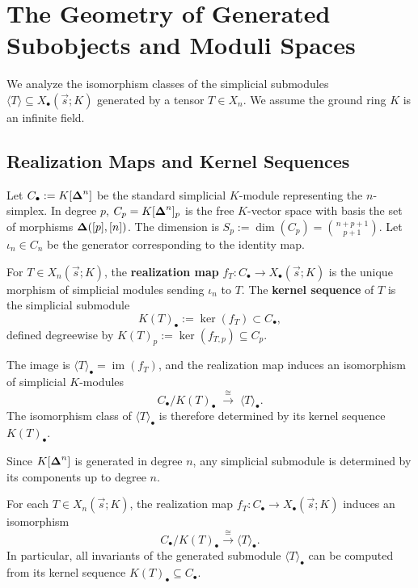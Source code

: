 \section{The Geometry of Generated Subobjects and Moduli Spaces}
\label{sec:generated}

We analyze the isomorphism classes of the simplicial submodules
$\langle T \rangle \subseteq X_\bullet(\vec s; K)$ generated by a tensor
$T\in X_n$. We assume the ground ring $K$ is an infinite field.


\subsection{Realization Maps and Kernel Sequences}

Let $C_\bullet := K[\boldsymbol{\Delta}^n]$ be the standard simplicial $K$-module representing the
$n$-simplex. In degree $p$, $C_p = K[\boldsymbol{\Delta}^n]_p$ is the free $K$-vector space
with basis the set of morphisms $\boldsymbol{\Delta}([p],[n])$. The dimension is
$S_p := \dim(C_p) = \binom{n+p+1}{p+1}$. Let
$\iota_n \in C_n$ be the generator corresponding to the identity map.

\begin{definition}
For $T\in X_n(\vec{s};K)$, the \textbf{realization map}
$f_T: C_\bullet \to X_\bullet(\vec s; K)$ is the unique morphism of
simplicial modules sending $\iota_n$ to $T$.
The \textbf{kernel sequence} of $T$ is the simplicial submodule
\[
K(T)_\bullet := \ker(f_T) \subset C_\bullet,
\]
defined degreewise by $K(T)_p := \ker(f_{T,p}) \subseteq C_p$.
\end{definition}

The image is $\langle T \rangle_\bullet = \operatorname{im}(f_T)$, and the
realization map induces an isomorphism of simplicial $K$-modules
\[
C_\bullet / K(T)_\bullet \;\xrightarrow{\ \cong\ }\; \langle T \rangle_\bullet.
\]
The isomorphism class of $\langle T \rangle_\bullet$ is therefore determined by
its kernel sequence $K(T)_\bullet$.

\begin{remark}\label{rem:finite_generation}
Since $K[\boldsymbol{\Delta}^n]$ is generated in degree $n$, any simplicial submodule is
determined by its components up to degree $n$.
\end{remark}


\begin{proposition}\label{prop:isomorphism-classes-and-orbits}
For each $T\in X_n(\vec{s};K)$, the realization map
$f_T:C_\bullet\to X_\bullet(\vec s;K)$ induces an isomorphism
\[
C_\bullet / K(T)_\bullet \xrightarrow{\ \cong\ } \langle T\rangle_\bullet.
\]
In particular, all invariants of the generated submodule $\langle T\rangle_\bullet$
can be computed from its kernel sequence $K(T)_\bullet \subseteq C_\bullet$.
\end{proposition}

